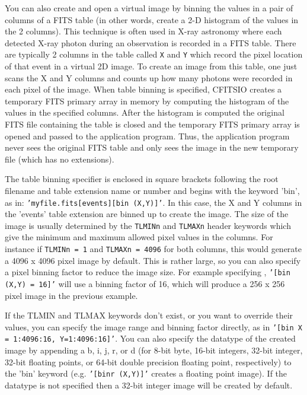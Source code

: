 \documentclass[11pt]{article}
\begin{document}
You can also create and open a virtual image by binning the values in a
pair of columns of a FITS table (in other words, create a 2-D histogram
of the values in the 2 columns).  This technique is often used in X-ray
astronomy where each detected X-ray photon during an observation is
recorded in a FITS table.  There are typically 2 columns in the table
called  {\tt X} and {\tt Y} which record the pixel location of that
event in a virtual 2D image.  To create an image from this table, one
just scans the X and Y columns and counts up how many photons were
recorded in each pixel of the image.  When table binning is specified,
CFITSIO creates a temporary FITS primary array in memory by computing
the histogram of the values in the specified columns.  After the
histogram is computed the original FITS file containing the table is
closed and the temporary FITS primary array is opened and passed to the
application program.  Thus, the application program never sees the
original FITS table and only sees the image in the new temporary file
(which has no extensions).

The table binning specifier is enclosed in square brackets following
the root filename and table extension name or number and begins with
the keyword 'bin', as in: \newline  
{\tt 'myfile.fits[events][bin (X,Y)]'}. In
this case, the X and Y columns in the 'events' table extension are
binned up to create the image.  The size of the image is usually
determined by the {\tt TLMINn} and {\tt TLMAXn} header keywords which
give the minimum and maximum allowed pixel values in the columns.  For
instance if {\tt TLMINn = 1} and {\tt TLMAXn = 4096} for both columns, this would
generate a 4096 x 4096 pixel image by default.  This is rather large,
so you can also specify a pixel binning factor to reduce the image
size.  For example specifying ,  {\tt '[bin (X,Y) = 16]'} will use a
binning factor of 16, which will produce a 256 x 256 pixel image in the
previous example.

If the TLMIN and TLMAX keywords don't exist, or you want to override
their values,  you can specify the image range and binning factor
directly, as in {\tt '[bin X = 1:4096:16, Y=1:4096:16]'}.  You can also
specify the datatype of the created image by appending a b, i, j, r, or
d (for 8-bit byte, 16-bit integers, 32-bit integer, 32-bit floating
points, or 64-bit double precision floating point, respectively)  to
the 'bin' keyword (e.g. {\tt '[binr (X,Y)]'} creates a floating point
image).  If the datatype is not specified then a 32-bit integer image
will be created by default.
\end{document}
